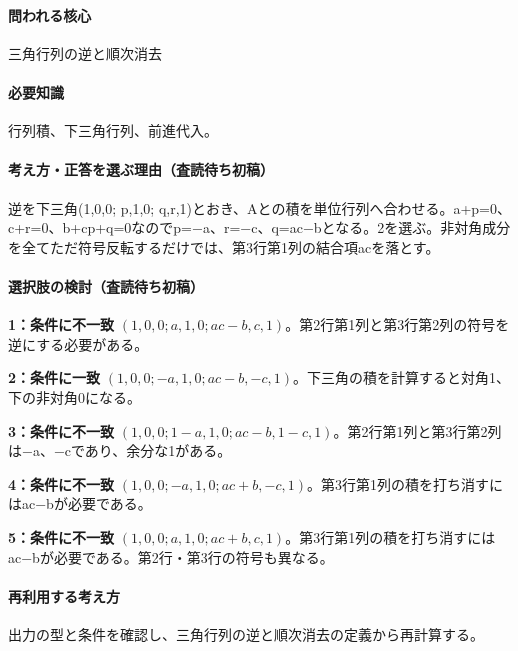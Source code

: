 \paragraph{問われる核心} 三角行列の逆と順次消去

\paragraph{必要知識} 行列積、下三角行列、前進代入。

\paragraph{考え方・正答を選ぶ理由（査読待ち初稿）} 逆を下三角(1,0,0; p,1,0; q,r,1)とおき、Aとの積を単位行列へ合わせる。a+p=\allowbreak{}0、c+r=\allowbreak{}0、b+cp+q=\allowbreak{}0なのでp=−a、r=−c、q=\allowbreak{}ac−bとなる。2を選ぶ。非対角成分を全てただ符号反転するだけでは、第3行第1列の結合項acを落とす。

\paragraph{選択肢の検討（査読待ち初稿）}\mbox{}\par

\noindent\textbf{1：条件に不一致} \((1,0,0;a,1,0;ac-b,c,1)\)。第2行第1列と第3行第2列の符号を逆にする必要がある。\par

\noindent\textbf{2：条件に一致} \((1,0,0;-a,1,0;ac-b,-c,1)\)。下三角の積を計算すると対角1、下の非対角0になる。\par

\noindent\textbf{3：条件に不一致} \((1,0,0;1-a,1,0;ac-b,1-c,1)\)。第2行第1列と第3行第2列は−a、−cであり、余分な1がある。\par

\noindent\textbf{4：条件に不一致} \((1,0,0;-a,1,0;ac+b,-c,1)\)。第3行第1列の積を打ち消すにはac−bが必要である。\par

\noindent\textbf{5：条件に不一致} \((1,0,0;a,1,0;ac+b,c,1)\)。第3行第1列の積を打ち消すにはac−bが必要である。第2行・第3行の符号も異なる。\par

\paragraph{再利用する考え方} 出力の型と条件を確認し、三角行列の逆と順次消去の定義から再計算する。


